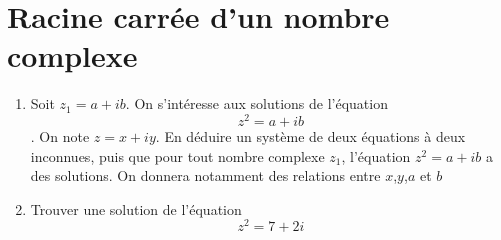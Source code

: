 \section{Racine carrée d'un nombre complexe}
\begin{enumerate}
\item Soit $z_1 = a+ib$. On s'intéresse aux solutions de l'équation $$z^2 = a+ib$$. On note $z = x+iy$. En déduire un système de deux équations à deux inconnues, puis que pour tout nombre complexe $z_1$, l'équation $z^2 = a+ib$ a des solutions. On donnera notamment des relations entre $x$,$y$,$a$ et $b$
\item Trouver une solution de l'équation 
$$z^2 = 7 + 2i$$
\end{enumerate}
